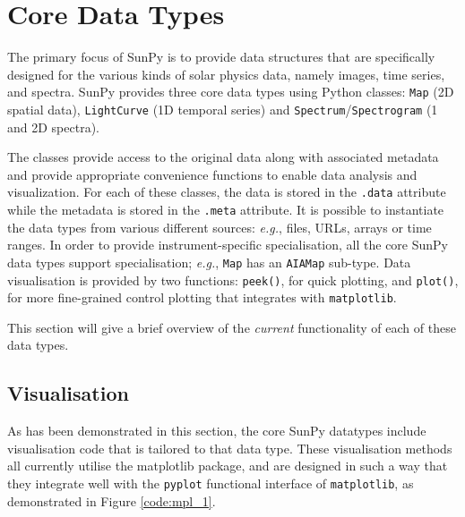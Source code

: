 \section{Core Data Types}
The primary focus of SunPy is to provide data structures 
that are specifically designed for the various kinds of solar physics data, namely
images, time series, and spectra. SunPy provides three core data
types using Python classes:
\texttt{Map} (2D spatial data),
\texttt{LightCurve} (1D temporal series)
and \texttt{Spectrum}/\texttt{Spectrogram} (1 and 2D spectra). 

The classes provide access to the original data
along with associated metadata and provide appropriate convenience functions to
enable data analysis and visualization. For each of these classes, the data is
stored in the \texttt{.data} attribute while the metadata is stored 
in the \texttt{.meta} attribute. It is 
possible to instantiate the data types from various different 
sources: \textit{e.g.}, files, URLs, arrays or time ranges.  In order to provide
instrument-specific specialisation, all the core SunPy data types support specialisation;
\textit{e.g.}, \texttt{Map} has an \texttt{AIAMap} sub-type. 
Data visualisation is provided by two functions: \texttt{peek()}, for quick plotting,
and \texttt{plot()}, for more fine-grained control plotting that integrates with 
\texttt{matplotlib}.

This section will give a brief overview of the \textit{current} functionality 
of each of these data types.





\subsection{Visualisation}
\label{subsec:Viz}
As has been demonstrated in this section, the core SunPy datatypes 
include visualisation code that is tailored to that data type. 
These visualisation methods all currently utilise the matplotlib 
package, and are designed in such a way that they integrate well with 
the \texttt{pyplot} functional interface of \texttt{matplotlib}, as demonstrated in 
Figure \ref{code:mpl_1}.

